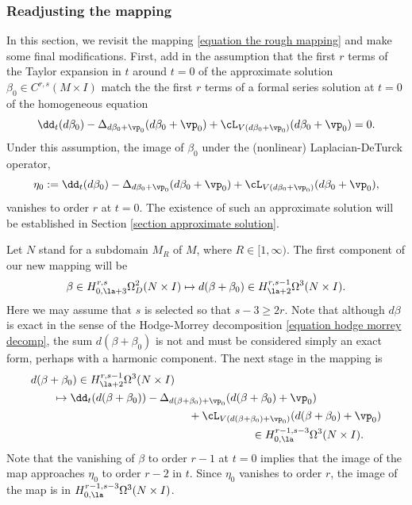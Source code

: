 \documentclass[hidelinks, 12pt, oneside, reqno]{amsart}
\begin{document}
\subsubsection{Readjusting the mapping}\label{subsubsection readjustment}

In this section, we revisit the mapping \eqref{equation the rough mapping} and make some final modifications. First, add in the assumption that the first $r$ terms of the Taylor expansion in $t$ around $t=0$ of the approximate solution $\beta_0 \in C^{r,s}(M \times I)$ match the the first $r$ terms of a formal series solution at $t = 0$ of the homogeneous equation
\[
\dd_t (d\beta_0) - \Delta_{d\beta_0 + \vp_0} (d\beta_0 + \vp_0) + \cL_{V(d\beta_0 + \vp_0)} (d\beta_0 + \vp_0) = 0.
\]
Under this assumption, the image of $\beta_0$ under the (nonlinear) Laplacian-DeTurck operator,
\begin{equation}\label{equation image approx solution}
\eta_0 := \dd_t (d\beta_0) - \Delta_{d\beta_0 + \vp_0} (d\beta_0 + \vp_0) + \cL_{V(d\beta_0 + \vp_0)} (d\beta_0 + \vp_0),
\end{equation}
vanishes to order $r$ at $t = 0$. The existence of such an approximate solution will be established in Section \ref{section approximate solution}. 

Let $N$ stand for a subdomain $M_R$ of $M$, where $R \in [1,\infty)$. The first component of our new mapping will be 
\begin{equation}\label{equation first component mapping}
\beta \in H^{r,s}_{0,\la+3} \Omega^2_D(N \times I) \mapsto d(\beta + \beta_0) \in H^{r,s-1}_{\la + 2}\Omega^3(N \times I) .
\end{equation}
Here we may assume that $s$ is selected so that $s-3 \ge 2r$. Note that although $d\beta$ is exact in the sense of the Hodge-Morrey decomposition \eqref{equation hodge morrey decomp}, the sum $d(\beta + \beta_0)$ is not and must be considered simply an exact form, perhaps with a harmonic component. The next stage in the mapping is 
\begin{align}
    &d(\beta + \beta_0) \in H_{\la +2}^{r,s-1}\Omega^3(N \times I) \nonumber\\ 
    & \qquad  \mapsto \dd_t (d(\beta + \beta_0)) - \Delta_{d(\beta + \beta_0) + \vp_0} (d(\beta + \beta_0) + \vp_0) \label{equation second component mapping} \\
    & \hspace{5cm}+ \cL_{V(d(\beta + \beta_0) + \vp_0)} (d(\beta + \beta_0) + \vp_0) \nonumber \\
    &\hspace{7cm} \in H_{0,\la}^{r-1,s-3}\Omega^3(N \times I). \nonumber
\end{align}
Note that the vanishing of $\beta$ to order $r-1$ at $t=0$ implies that the image of the map approaches $\eta_0$ to order $r-2$ in $t$. Since $\eta_0$ vanishes to order $r$, the image of the map is in $H_{0,\la}^{r-1,s-3}\Omega^3(N \times I)$.
\end{document}
